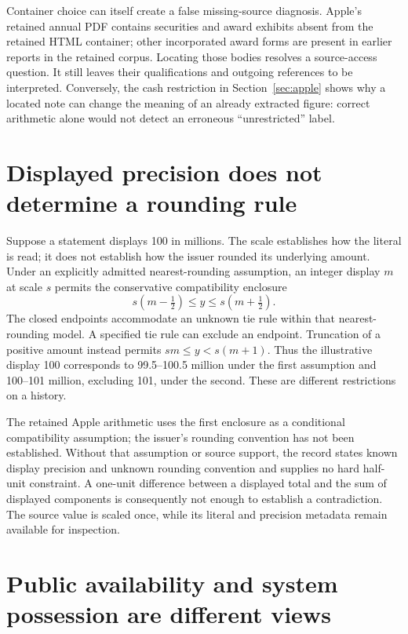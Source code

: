 Container choice can itself create a false missing-source diagnosis. Apple's
retained annual PDF contains securities and award exhibits absent from the
retained HTML container; other incorporated award forms are present in earlier
reports in the retained corpus. Locating those bodies resolves a source-access
question. It still leaves their qualifications and outgoing references to be
interpreted. Conversely, the cash restriction in Section~\ref{sec:apple} shows
why a located note can change the meaning of an already extracted figure:
correct arithmetic alone would not detect an erroneous ``unrestricted'' label.

\section{Displayed precision does not determine a rounding rule}
\label{sec:source-rounding}

Suppose a statement displays 100 in millions. The scale establishes how the
literal is read; it does not establish how the issuer rounded its underlying
amount. Under an explicitly admitted nearest-rounding assumption, an integer
display $m$ at scale $s$ permits the conservative compatibility enclosure
\[
       s(m-\tfrac12)\leq y\leq s(m+\tfrac12).
\]
The closed endpoints accommodate an unknown tie rule within that nearest-rounding
model. A specified tie rule can exclude an endpoint. Truncation of a positive
amount instead permits $sm\leq y<s(m+1)$. Thus the illustrative display 100
corresponds to 99.5--100.5 million under the first assumption and 100--101 million,
excluding 101, under the second. These are different restrictions on a history.

The retained Apple arithmetic uses the first enclosure as a conditional
compatibility assumption; the issuer's rounding convention has not been
established. Without that assumption or source support, the record states
known display precision and unknown rounding convention and supplies no hard
half-unit constraint. A one-unit difference between a displayed total and the
sum of displayed components is consequently not enough to establish a
contradiction. The source value is scaled once, while its literal and precision
metadata remain available for inspection.

\section{Public availability and system possession are different views}
\label{sec:time-admission}


